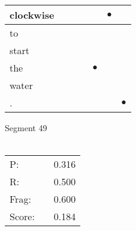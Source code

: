 \documentclass[landscape]{article}
\newcommand{\ssp}{\hspace{2pt}}
\newcommand{\mex}{\cellcolor{g}$\bullet$}
\begin{document}
\begin{tabular}{|l|p{10pt}|p{10pt}|p{10pt}|p{10pt}|p{10pt}|p{10pt}|}
\hline
\ssp \cellcolor{ref4}clockwise \ssp&\hspace{2pt}&\hspace{2pt}&\hspace{2pt}&\hspace{2pt}&\hspace{2pt}\mex&\hspace{2pt}\\
\hline
\ssp to \ssp&\hspace{2pt}&\hspace{2pt}&\hspace{2pt}&\hspace{2pt}&\hspace{2pt}&\hspace{2pt}\\
\hline
\ssp start \ssp&\hspace{2pt}&\hspace{2pt}&\hspace{2pt}&\hspace{2pt}&\hspace{2pt}&\hspace{2pt}\\
\hline
\ssp \cellcolor{ref3}the \ssp&\hspace{2pt}&\hspace{2pt}&\hspace{2pt}&\hspace{2pt}\mex&\hspace{2pt}&\hspace{2pt}\\
\hline
\ssp water \ssp&\hspace{2pt}&\hspace{2pt}&\hspace{2pt}&\hspace{2pt}&\hspace{2pt}&\hspace{2pt}\\
\hline
\ssp \cellcolor{ref5}. \ssp&\hspace{2pt}&\hspace{2pt}&\hspace{2pt}&\hspace{2pt}&\hspace{2pt}&\hspace{2pt}\mex\\
\hline
\end{tabular}

\vspace{6pt}
\noindent Segment 49\\\\
\noindent\begin{tabular}{lm{12pt}r}
\hline
P:&&0.316\\
R:&&0.500\\
Frag:&&0.600\\
Score:&&0.184\\
\end{tabular}
\end{document}
